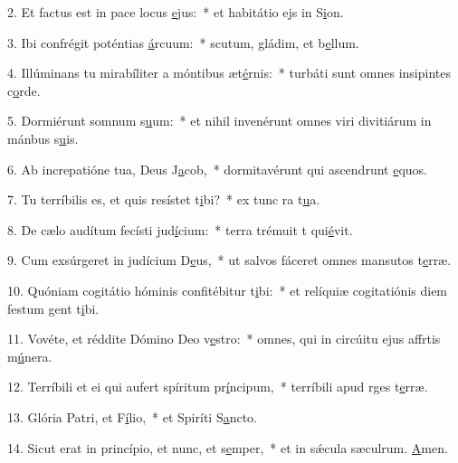 2. Et factus est in pace locus \uline{e}jus:~* et habitátio ejs in S\uline{i}on.\par 
3. Ibi confrégit poténtias \uline{á}rcuum:~* scutum, gládim, et b\uline{e}llum.\par 
4. Illúminans tu mirabíliter a móntibus æt\uline{é}rnis:~* turbáti sunt omnes insipintes c\uline{o}rde.\par 
5. Dormiérunt somnum s\uline{u}um:~* et nihil invenérunt omnes viri divitiárum in mánbus s\uline{u}is.\par 
6. Ab increpatióne tua, Deus J\uline{a}cob,~* dormitavérunt qui ascendrunt \uline{e}quos.\par 
7. Tu terríbilis es, et quis resístet t\uline{i}bi?~* ex tunc ra t\uline{u}a.\par 
8. De cælo audítum fecísti jud\uline{í}cium:~* terra trémuit t qui\uline{é}vit.\par 
9. Cum exsúrgeret in judícium D\uline{e}us,~* ut salvos fáceret omnes mansutos t\uline{e}rræ.\par 
10. Quóniam cogitátio hóminis confitébitur t\uline{i}bi:~* et relíquiæ cogitatiónis diem festum gent t\uline{i}bi.\par 
11. Vovéte, et réddite Dómino Deo v\uline{e}stro:~* omnes, qui in circúitu ejus affrtis m\uline{ú}nera.\par 
12. Terríbili et ei qui aufert spíritum pr\uline{í}ncipum,~* terríbili apud rges t\uline{e}rræ.\par 
13. Glória Patri, et F\uline{í}lio,~* et Spiríti S\uline{a}ncto.\par 
14. Sicut erat in princípio, et nunc, et s\uline{e}mper,~* et in sǽcula sæculrum. \uline{A}men.\par 
